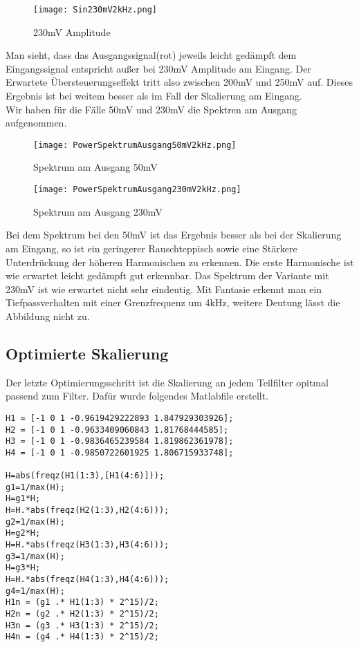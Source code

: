 \begin{figure}[H]
  \centering
    \texttt{[image: Sin230mV2kHz.png]}
  \caption{230mV Amplitude}
  \label{fig:Sin230mV2kHz}
\end{figure}
Man sieht, dass das Ausgangssignal(rot) jeweils leicht gedämpft dem Eingangssignal entspricht außer bei 230mV Amplitude am Eingang. Der Erwartete Übersteuerungseffekt tritt also zwischen 200mV und 250mV auf. Dieses Ergebnis ist bei weitem besser als im Fall der Skalierung am Eingang.\\
Wir haben für die Fälle 50mV und 230mV die Spektren am Ausgang aufgenommen.\\
\begin{figure}[H]
  \centering
    \texttt{[image: PowerSpektrumAusgang50mV2kHz.png]}
  \caption{Spektrum am Ausgang 50mV}
  \label{fig:PowerSpektrumAusgang50mV2kHz}
\end{figure}
\begin{figure}[H]
  \centering
    \texttt{[image: PowerSpektrumAusgang230mV2kHz.png]}
  \caption{Spektrum am Ausgang 230mV}
  \label{fig:PowerSpektrumAusgang230mV2kHz}
\end{figure}
Bei dem Spektrum bei den 50mV ist das Ergebnis besser als bei der Skalierung am Eingang, so ist ein geringerer Rauschteppisch sowie eine Stärkere Unterdrückung der höheren Harmonischen zu erkennen. Die erste Harmonische ist wie erwartet leicht gedämpft gut erkennbar. Das Spektrum der Variante mit 230mV ist wie erwartet nicht sehr eindeutig. Mit Fantasie erkennt man ein Tiefpassverhalten mit einer Grenzfrequenz um 4kHz, weitere Deutung lässt die Abbildung nicht zu.

\subsection{Optimierte Skalierung}
Der letzte Optimierungsschritt ist die Skalierung an jedem Teilfilter opitmal passend zum Filter.
Dafür wurde folgendes Matlabfile erstellt.\\
\begin{adjustbox}{}
 \begin{lstlisting}[title=optimierung.m]
 H1 = [-1 0 1 -0.9619429222893 1.847929303926];
H2 = [-1 0 1 -0.9633409060843 1.81768444585];
H3 = [-1 0 1 -0.9836465239584 1.819862361978];
H4 = [-1 0 1 -0.9850722601925 1.806715933748];

H=abs(freqz(H1(1:3),[H1(4:6)]));
g1=1/max(H);
H=g1*H;
H=H.*abs(freqz(H2(1:3),H2(4:6)));
g2=1/max(H);
H=g2*H;
H=H.*abs(freqz(H3(1:3),H3(4:6)));
g3=1/max(H);
H=g3*H;
H=H.*abs(freqz(H4(1:3),H4(4:6)));
g4=1/max(H);
H1n = (g1 .* H1(1:3) * 2^15)/2;
H2n = (g2 .* H2(1:3) * 2^15)/2;
H3n = (g3 .* H3(1:3) * 2^15)/2;
H4n = (g4 .* H4(1:3) * 2^15)/2;
\end{lstlisting}
\end{adjustbox}

